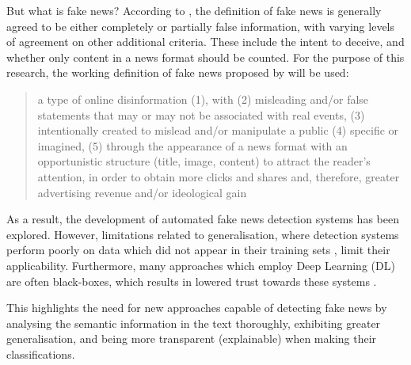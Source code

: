 \documentclass[
]{article}
\begin{document}
But what is fake news? According to \textcite{definition}, the definition of fake news is generally agreed to be either completely or partially false information, with varying levels of agreement on other additional criteria. These include the intent to deceive, and whether only content in a news format should be counted. For the purpose of this research, the working definition of fake news proposed by \textcite{definition} will be used: 

\begin{quote}
    a type of online disinformation (1), with (2) misleading
and/or false statements that may or may not be associated with real events, (3) intentionally
created to mislead and/or manipulate a public (4) specific or imagined, (5) through the
appearance of a news format with an opportunistic structure (title, image, content) to attract
the reader’s attention, in order to obtain more clicks and shares and, therefore, greater
advertising revenue and/or ideological gain \textcite{definition}
\end{quote} 


As a result, the development of automated fake news detection systems has been explored. However, limitations related to generalisation, where detection systems perform poorly on data which did not appear in their training sets \parencite{BERT-finetuning}, limit their applicability. Furthermore, many approaches which employ Deep Learning (DL) are often black-boxes, which results in lowered trust towards these systems \parencite{xai-bert}. 

This highlights the need for new approaches capable of detecting fake news by analysing the semantic information in the text thoroughly, exhibiting greater generalisation, and being more transparent (explainable) when making their classifications.
\end{document}
